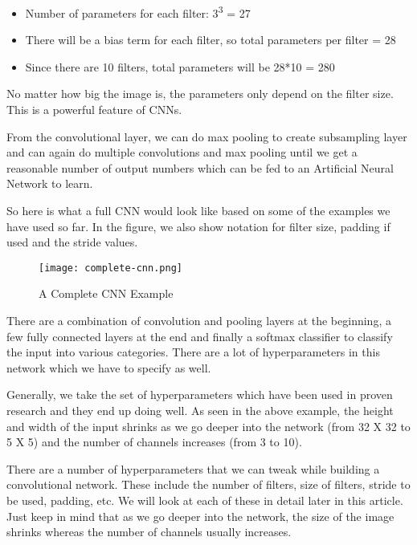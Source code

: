 \begin{itemize}
  \item Number of parameters for each filter: 3\textsuperscript{3} = 27
  \item There will be a bias term for each filter, so total parameters per filter = 28
  \item Since there are 10 filters, total parameters will be 28*10 = 280
\end{itemize}

No matter how big the image is, the parameters only depend on the filter size. This is a powerful feature of CNNs.
\par
From the convolutional layer, we can do max pooling to create subsampling layer and can again do multiple convolutions and max pooling until we get a reasonable number of output numbers which can be fed to an Artificial Neural Network to learn.
\par
So here is what a full CNN would look like based on some of the examples we have used so far. In the figure, we also show notation for filter size, padding if used and the stride values.

\begin{figure}
  \caption{A Complete CNN Example}
  \texttt{[image: complete-cnn.png]}
\end{figure}

There are a combination of convolution and pooling layers at the beginning, a few fully connected layers at the end and finally a softmax classifier to classify the input into various categories. There are a lot of hyperparameters in this network which we have to specify as well.
\par
Generally, we take the set of hyperparameters which have been used in proven research and they end up doing well. As seen in the above example, the height and width of the input shrinks as we go deeper into the network (from 32 X 32 to 5 X 5) and the number of channels increases (from 3 to 10).
\par
There are a number of hyperparameters that we can tweak while building a convolutional network.
These include the number of filters, size of filters, stride to be used, padding, etc. We will look at each of these in detail later in this article. Just keep in mind that as we go deeper into the network, the size of the image shrinks whereas the number of channels usually increases.
